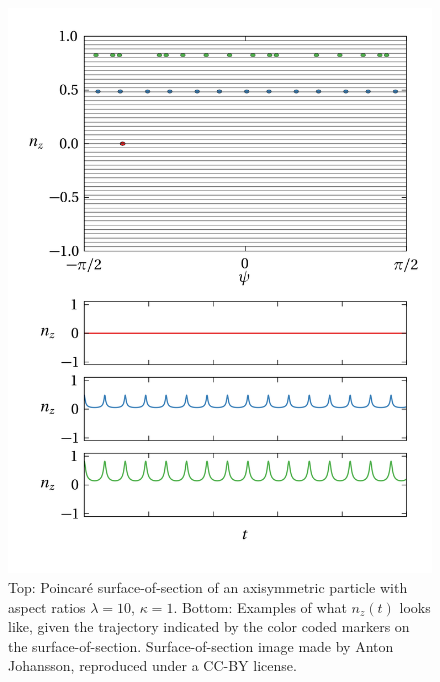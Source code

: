 \documentclass[thesis.tex]{subfiles}
\begin{document}
\begin{figure}
\includegraphics[width=12cm]{figs/poincareA.png}%
\caption{\label{fig:poincareA} Top: Poincar\'e surface-of-section of an axisymmetric particle with aspect ratios $\lambda=10$, $\kappa=1$. Bottom: Examples of what $n_z(t)$ looks like, given the trajectory indicated by the color coded markers on the surface-of-section. Surface-of-section image made by Anton Johansson, reproduced under a CC-BY license.}%
\end{figure}
\end{document}
